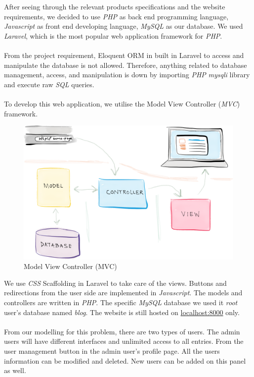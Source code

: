 After seeing through the relevant products specifications and the website requirements, we decided to use \textit{PHP} as back end programming language, \textit{Javascript} as front end developing language, \textit{MySQL} as our database. We used \textit{Laravel}, which is the most popular web application framework for \textit{PHP}.\\
\\
From the project requirement, Eloquent ORM in built in Laravel to access and manipulate the database is not allowed. Therefore, anything related to database management, access, and manipulation is down by importing \textit{PHP} \textit{mysqli} library and execute raw \textit{SQL} queries.\\
\\
To develop this web application, we utilise the Model View Controller (\textit{MVC}) framework.\\

\begin{figure}[h]
      \centering
	\includegraphics[scale=0.2]{MVC_framework.png}
      \caption{Model View Controller (MVC)}
\end{figure}

We use \textit{CSS} Scaffolding in Laravel to take care of the views. Buttons and redirections from the user side are implemented in \textit{Javascript}. The models and controllers are written in \textit{PHP}. The specific \textit{MySQL} database we used it \textit{root} user's database named \textit{blog}. The website is still hosted on \url{localhost:8000} only.\\
\\
From our modelling for this problem, there are two types of users. The admin users will have different interfaces and unlimited access to all entries. From the user management button in the admin user's profile page. All the users information can be modified and deleted. New users can be added on this panel as well.

